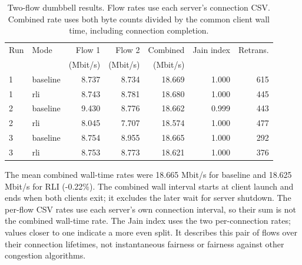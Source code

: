 \begin{table}[H]\centering\small
\begin{tabular}{llrrrrr}\toprule
Run & Mode & Flow 1 & Flow 2 & Combined & Jain index & Retrans.\\
 & & (Mbit/s) & (Mbit/s) & (Mbit/s) & & \\\midrule
1 & baseline & 8.737 & 8.734 & 18.669 & 1.000 & 615 \\
1 & rli & 8.743 & 8.781 & 18.680 & 1.000 & 445 \\
2 & baseline & 9.430 & 8.776 & 18.662 & 0.999 & 443 \\
2 & rli & 8.045 & 7.707 & 18.574 & 1.000 & 477 \\
3 & baseline & 8.754 & 8.955 & 18.665 & 1.000 & 292 \\
3 & rli & 8.753 & 8.773 & 18.621 & 1.000 & 376 \\
\bottomrule\end{tabular}
\caption{Two-flow dumbbell results. Flow rates use each server's connection CSV. Combined rate uses both byte counts divided by the common client wall time, including connection completion.}\end{table}
The mean combined wall-time rates were 18.665 Mbit/s for baseline and 18.625 Mbit/s for RLI (-0.22\%). The combined wall interval starts at client launch and ends when both clients exit; it excludes the later wait for server shutdown. The per-flow CSV rates use each server's own connection interval, so their sum is not the combined wall-time rate. The Jain index uses the two per-connection rates; values closer to one indicate a more even split. It describes this pair of flows over their connection lifetimes, not instantaneous fairness or fairness against other congestion algorithms.
